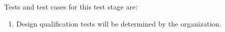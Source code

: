 Tests and test cases for this test stage are:
\begin{enumerate}[itemindent=5pt,topsep=0pt,itemsep=0pt,partopsep=0pt, parsep=0pt]
	
	\item {\bf \TBD} Design qualification tests will be determined  by the \StageDT organization.

\end{enumerate}
